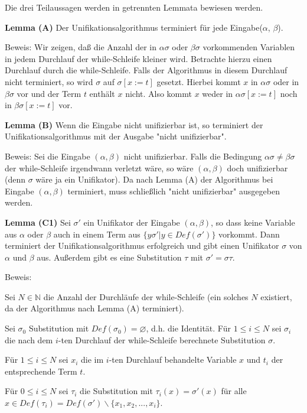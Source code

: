 \documentclass[a4paper]{article}
\renewcommand{\note}[2]{\begin{noteBox} \textbf{#1} #2 \end{noteBox}}
\begin{document}
\begin{multicols}{3}
  Die drei Teilaussagen werden in getrennten Lemmata bewiesen werden.

  \note{Lemma (A)}{Der Unifikationsalgorithmus terminiert für jede Eingabe($\alpha$, $\beta$).}

  Beweis: Wir zeigen, daß die Anzahl der in $\alpha\sigma$ oder $\beta\sigma$ vorkommenden Variablen in jedem Durchlauf der while-Schleife kleiner wird.
  Betrachte hierzu einen Durchlauf durch die while-Schleife.
  Falls der Algorithmus in diesem Durchlauf nicht terminiert, so wird $\sigma$ auf $\sigma[x:=t]$ gesetzt.
  Hierbei kommt $x$ in $\alpha\sigma$ oder in $\beta\sigma$ vor und der Term $t$ enthält $x$ nicht.
  Also kommt $x$ weder in $\alpha\sigma[x:=t]$ noch in $\beta\sigma[x:=t]$ vor.

  \note{Lemma (B)}{Wenn die Eingabe nicht unifizierbar ist, so terminiert der Unifikationsalgorithmus mit der Ausgabe "nicht unifizierbar".}

  Beweis: Sei die Eingabe $(\alpha,\beta)$ nicht unifizierbar.
  Falls die Bedingung $\alpha\sigma\not=\beta\sigma$ der while-Schleife irgendwann verletzt wäre, so wäre $(\alpha,\beta)$ doch unifizierbar (denn $\sigma$ wäre ja ein Unifikator).
  Da nach Lemma (A) der Algorithmus bei Eingabe $(\alpha,\beta)$ terminiert, muss schließlich "nicht unifizierbar" ausgegeben werden.

  \note{Lemma (C1)}{Sei $\sigma'$ ein Unifikator der Eingabe $(\alpha,\beta)$, so dass keine Variable aus $\alpha$ oder $\beta$ auch in einem Term aus $\{y\sigma'|y\in Def(\sigma')\}$ vorkommt. Dann terminiert der Unifikationsalgorithmus erfolgreich und gibt einen Unifikator $\sigma$ von $\alpha$ und $\beta$ aus. Außerdem gibt es eine Substitution $\tau$ mit $\sigma'=\sigma\tau$.}

  Beweis:
  \begin{itemize*}
    \item Sei $N\in\mathbb{N}$ die Anzahl der Durchläufe der while-Schleife (ein solches $N$ existiert, da der Algorithmus nach Lemma (A) terminiert).
    \item Sei $\sigma_0$ Substitution mit $Def(\sigma_0) =\varnothing$, d.h. die Identität. Für $1\leq i\leq N$ sei $\sigma_i$ die nach dem $i$-ten Durchlauf der while-Schleife berechnete Substitution $\sigma$.
    \item Für $1\leq i\leq N$ sei $x_i$ die im $i$-ten Durchlauf behandelte Variable $x$ und $t_i$ der entsprechende Term $t$.
    \item Für $0\leq i\leq N$ sei $\tau_i$ die Substitution mit $\tau_i(x)=\sigma'(x)$ für alle $x\in Def(\tau_i) =Def(\sigma')\backslash\{x_1,x_2,...,x_i\}$.
  \end{itemize*}


\end{multicols}
\end{document}
